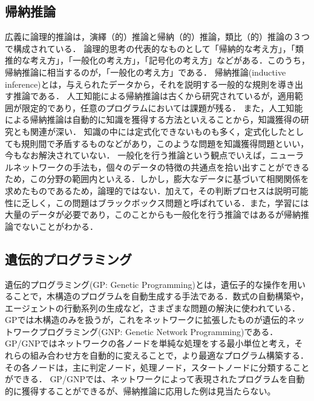 \documentclass[exploratorypaper]{jsaiart} %
\begin{document}
\subsection{帰納推論}
広義に論理的推論は，演繹（的）推論と帰納（的）推論，類比（的）推論の３つで構成されている\cite{math300}．
論理的思考の代表的なものとして「帰納的な考え方」，「類推的な考え方」，「一般化の考え方」，「記号化の考え方」などがある\cite{saito:11}．このうち，帰納推論に相当するのが，「一般化の考え方」である．
帰納推論(inductive inference)とは，与えられたデータから，それを説明する一般的な規則を導き出す推論である\cite{帰納推論}．
人工知能による帰納推論は古くから研究されているが\cite{CASE1983193}\cite{4767034}，適用範囲が限定的であり，任意のプログラムにおいては課題が残る．
また，人工知能による帰納推論は自動的に知識を獲得する方法といえることから，知識獲得の研究とも関連が深い．
知識の中には定式化できないものも多く，定式化したとしても規則間で矛盾するものなどがあり，このような問題を知識獲得問題といい\cite{KnowledgeAI}\cite{KAIssues}，今もなお解決されていない．
一般化を行う推論という観点でいえば，ニューラルネットワークの手法も，個々のデータの特徴の共通点を拾い出すことができるため，この分野の範囲内といえる．しかし，膨大なデータに基づいて相関関係を求めたものであるため，論理的ではない．加えて，その判断プロセスは説明可能性に乏しく，この問題はブラックボックス問題と呼ばれている\cite{BlackBoxProblem}．また，学習には大量のデータが必要であり，このことからも一般化を行う推論ではあるが帰納推論でないことがわかる．
\subsection{遺伝的プログラミング}
遺伝的プログラミング(GP: Genetic Programming)とは，遺伝子的な操作を用いることで，木構造のプログラムを自動生成する手法である\cite{Koza1994}．数式の自動構築や，エージェントの行動系列の生成など，さまざまな問題の解決に使われている．GPでは木構造のみを扱うが，これをネットワークに拡張したものが遺伝的ネットワークプログラミング(GNP: Genetic Network Programming)である\cite{gnp}．
GP/GNPではネットワークの各ノードを単純な処理をする最小単位と考え，それらの組み合わせ方を自動的に変えることで，より最適なプログラム構築する．その各ノードは，主に判定ノード，処理ノード，スタートノードに分類することができる．
GP/GNPでは、ネットワークによって表現されたプログラムを自動的に獲得することができるが、帰納推論に応用した例は見当たらない。
\end{document}
